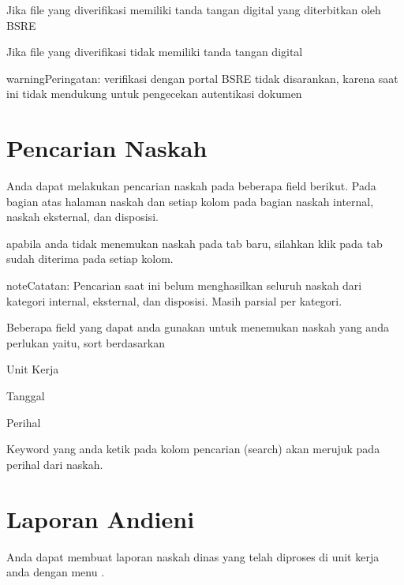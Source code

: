 \documentclass[letterpaper,10pt,bahasai]{sphinxmanual}
\begin{document}
Jika file yang diverifikasi memiliki tanda tangan digital yang diterbitkan oleh BSRE

\noindent{}

Jika file yang diverifikasi tidak memiliki tanda tangan digital

\noindent{}

\begin{sphinxadmonition}{warning}{Peringatan:}
verifikasi dengan portal BSRE tidak disarankan, karena saat ini tidak mendukung untuk pengecekan autentikasi dokumen
\end{sphinxadmonition}


\chapter{Pencarian Naskah}
\label{\detokenize{pencarian:pencarian-naskah}}\label{\detokenize{pencarian::doc}}
Anda dapat melakukan pencarian naskah pada beberapa field berikut. Pada bagian atas halaman naskah dan setiap kolom
pada bagian naskah internal, naskah eksternal, dan disposisi.

\noindent{}

\noindent{}

apabila anda tidak menemukan naskah pada tab baru, silahkan klik pada tab sudah diterima pada setiap kolom.

\begin{sphinxadmonition}{note}{Catatan:}
Pencarian saat ini belum menghasilkan seluruh naskah dari kategori internal, eksternal, dan disposisi. Masih parsial per kategori.
\end{sphinxadmonition}

Beberapa field yang dapat anda gunakan untuk menemukan naskah yang anda perlukan yaitu, sort berdasarkan

\begin{DUlineblock}{0em}
\item[] Unit Kerja
\item[] Tanggal
\item[] Perihal
\end{DUlineblock}

Keyword yang anda ketik pada kolom pencarian (search) akan merujuk pada perihal dari naskah.


\chapter{Laporan Andieni}
\label{\detokenize{laporan:laporan-andieni}}\label{\detokenize{laporan::doc}}
Anda dapat membuat laporan naskah dinas yang telah diproses di unit kerja anda dengan menu .
\end{document}
